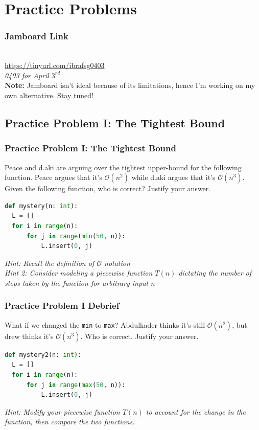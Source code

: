 \documentclass[hyperref={colorlinks,citecolor=blue,linkcolor=blue,urlcolor=blue}, aspectratio=1610]{beamer}
\begin{document}
\section{Practice Problems}

\begin{frame}
  \frametitle{Jamboard Link}
  \begin{center}
    \\
    \url{https://tinyurl.com/ibrafsg0403}\\
    \textit{0403 for April $3^{rd}$}\\
    \textbf{Note:} Jamboard isn't ideal because of its limitations, hence I'm working on my own alternative. Stay tuned!
  \end{center}
\end{frame}

\subsection{Practice Problem I: The Tightest Bound} 
\begin{frame}[fragile]
  \frametitle{Practice Problem I: The Tightest Bound}
  Peace and d.aki are arguing over the tightest upper-bound for the following function. Peace argues that it's $\mathcal{O}(n^2)$ while d.aki argues that it's $\mathcal{O}(n^3)$. Given the following function, who is correct? Justify your answer.

  \begin{lstlisting}[language=Python,style=mystyle]
def mystery(n: int):
  L = []
  for i in range(n):
      for j in range(min(50, n)):
          L.insert(0, j)
  \end{lstlisting}

  \textit{Hint: Recall the definition of $\mathcal{O}$ notation}\\
  \textit{Hint 2: Consider modeling a piecewise function $T(n)$ dictating the number of steps taken by the function for arbitrary input $n$}\\
\end{frame}

\begin{frame}[fragile]
  
  \frametitle{Practice Problem I Debrief}
  What if we changed the \texttt{min} to \texttt{max}? Abdulkader thinks it's still $\mathcal{O}(n^2)$, but drew thinks it's $\mathcal{O}(n^3)$. Who is correct. Justify your answer.
  \begin{lstlisting}[language=Python,style=mystyle]
def mystery2(n: int):
  L = []
  for i in range(n):
      for j in range(max(50, n)):
          L.insert(0, j)
  \end{lstlisting}
  \textit{Hint: Modify your piecewise function $T(n)$ to account for the change in the function, then compare the two functions.}\\
\end{frame}
\end{document}
